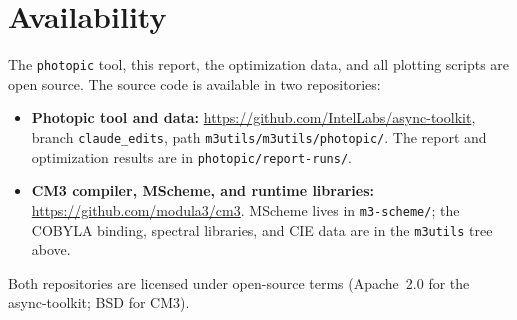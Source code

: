 \documentclass[11pt]{article}
\begin{document}
\section*{Availability}

The \texttt{photopic} tool, this report, the optimization data, and all
plotting scripts are open source.  The source code is available in two
repositories:

\begin{itemize}
\item \textbf{Photopic tool and data:}
  \url{https://github.com/IntelLabs/async-toolkit}, branch
  \texttt{claude\_edits}, path
  \texttt{m3utils/m3utils/photopic/}.
  The report and optimization results are in
  \texttt{photopic/report-runs/}.

\item \textbf{CM3 compiler, MScheme, and runtime libraries:}
  \url{https://github.com/modula3/cm3}.
  MScheme lives in \texttt{m3-scheme/}; the COBYLA binding, spectral
  libraries, and CIE data are in the \texttt{m3utils} tree above.
\end{itemize}

\noindent
Both repositories are licensed under open-source terms (Apache~2.0 for
the async-toolkit; BSD for CM3).
\end{document}
